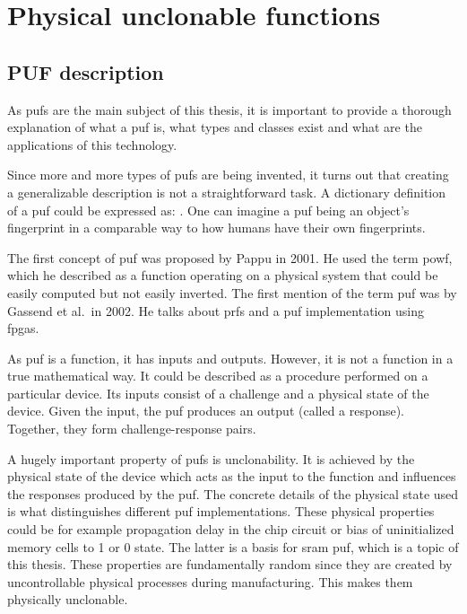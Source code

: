 \chapter{Physical unclonable functions}

\section{PUF description}

As \glspl{puf} are the main subject of this thesis, it is important to provide a thorough explanation of what a \gls{puf} is, what types and classes exist and what are
the applications of this technology.

Since more and more types of \glspl{puf} are being invented, it turns out that creating a generalizable description is not a straightforward task. A dictionary definition of a \gls{puf} could be expressed as: . One can imagine a \gls{puf} being an object's fingerprint in a comparable way to how humans have their own fingerprints.\cite{Maes2013}

The first concept of \gls{puf} was proposed by Pappu in 2001. He used the term \gls{powf}, which he described as a function operating on a physical system that could be easily computed but not easily inverted.\cite{Pappu2001} The first mention of the term \gls{puf} was by Gassend et al.\ in 2002. He talks about \glspl{prf} and a \gls{puf} implementation using \glspl{fpga}.\cite{Gassend2002}

As \gls{puf} is a function, it has inputs and outputs. However, it is not a function in a true mathematical way. It could be described as a procedure performed on a particular device. Its inputs consist of a challenge and a physical state of the device. Given the input, the \gls{puf} produces an output (called a response). Together, they form challenge-response pairs.   

A hugely important property of \glspl{puf} is unclonability. It is achieved by the physical state of the device which acts as the input to the function and influences the responses produced by the \gls{puf}. The concrete details of the physical state used is what distinguishes different \gls{puf} implementations. These physical properties could be for example propagation delay in the chip circuit or bias of uninitialized memory cells to 1 or 0 state. The latter is a basis for \gls{sram} \gls{puf}, which is a topic of this thesis. These properties are fundamentally random since they are created by uncontrollable physical processes during manufacturing. This makes them physically unclonable.

